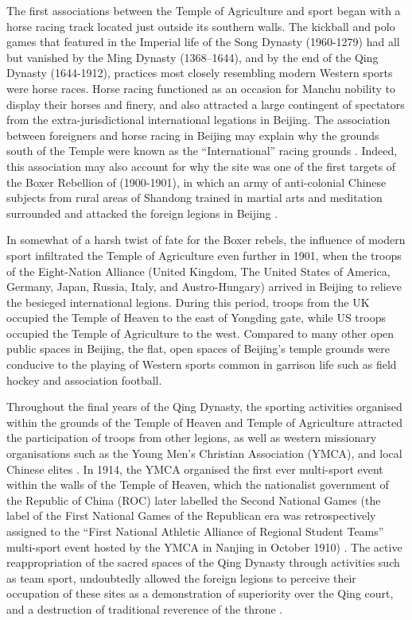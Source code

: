 The first associations between the Temple of Agriculture and sport began with a horse racing track located just outside its southern walls.  The kickball and polo games that featured in the Imperial life of the Song Dynasty (1960-1279) had all but vanished by the Ming Dynasty (1368–1644), and by the end of the Qing Dynasty (1644-1912), practices most closely resembling modern Western sports were horse races.  Horse racing functioned as an occasion for Manchu nobility to display their horses and finery, and also attracted a large contingent of spectators from the extra-jurisdictional international legations in Beijing.  The association between foreigners and horse racing in Beijing may explain why the grounds south of the Temple were known as the ``International'' racing grounds \citep{Brownell2008}. Indeed, this association may also account for why the site was one of the first targets of the Boxer Rebellion of (1900-1901), in which an army of anti-colonial Chinese subjects from rural areas of Shandong trained in martial arts and meditation surrounded and attacked the foreign legions in Beijing \citep{Brownell2008}.

In somewhat of a harsh twist of fate for the Boxer rebels, the influence of modern sport infiltrated the Temple of Agriculture even further in 1901, when the troops of the Eight-Nation Alliance (United Kingdom, The United States of America, Germany, Japan, Russia, Italy, and Austro-Hungary) arrived in Beijing to relieve the besieged international legions.  During this period, troops from the UK occupied the Temple of Heaven to the east of Yongding gate, while US troops occupied the Temple of Agriculture to the west. Compared to many other open public spaces in Beijing, the flat, open spaces of Beijing's temple grounds were conducive to the playing of Western sports common in garrison life such as field hockey and association football.

Throughout the final years of the Qing Dynasty, the sporting activities organised within the grounds of the Temple of Heaven and Temple of Agriculture attracted the participation of troops from other legions, as well as western missionary organisations such as the Young Men’s Christian Association (YMCA), and local Chinese elites \citep{Steel1985}. In 1914, the YMCA organised the first ever multi-sport event within the walls of the Temple of Heaven, which the nationalist government of the Republic of China (ROC) later labelled the Second National Games (the label of the First National Games of the Republican era was retrospectively assigned to the ``First National Athletic Alliance of Regional Student Teams'' multi-sport event hosted by the YMCA in Nanjing in October 1910) \citep[441]{Li2015}. The active reappropriation of the sacred spaces of the Qing Dynasty through activities such as team sport, undoubtedly allowed the foreign legions to perceive their occupation of these sites as a demonstration of superiority over the Qing court, and a destruction of traditional reverence of the throne \citep{Hevia1990}.

